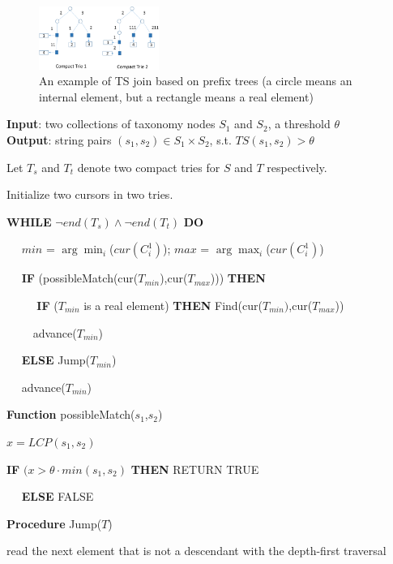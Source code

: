 \begin{figure}[t]
\centering
\includegraphics[width=0.35\textwidth]{figures/prefixTrees}
 \caption{An example of TS join based on prefix trees (a circle means an internal element, but a rectangle means a real element)}
\label{fig:taxonomyexample}
\end{figure}



\begin{algorithm}
{\bf Input}: two collections of taxonomy nodes $S_1$ and $S_2$,  a threshold $\theta$ \\
{\bf Output}: string pairs $(s_1,s_2) \in S_1 \times S_2$, s.t. $TS(s_1, s_2) > \theta$
\begin{compactenum}[(1)]
\item Let $T_s$ and $T_t$ denote two compact tries for $S$ and $T$ respectively. 
\item Initialize two cursors in two tries.
\item {\bf WHILE} $\neg end(T_s) \wedge  \neg end(T_t)$ {\bf DO}
\item  ~~ $min$ = $\arg\min_{i}$($cur(C_i^1)$); $max$ = $\arg\max_{i}$($cur(C_i^1)$)
\item  ~~ {\bf IF} (possibleMatch(cur($T_{min}$),cur($T_{max}$))) {\bf THEN}
\item ~~ ~~ {\bf  IF} ($T_{min}$ is a real element)   {\bf THEN} Find(cur($T_{min})$,cur($T_{max}$))
 \item ~~~~ advance($T_{min}$)
 \item ~~ {\bf ELSE} Jump($T_{min}$)
 \item ~~ advance($T_{min}$)
\end{compactenum}
\smallskip
\textbf{Function} possibleMatch($s_1$,$s_2$)
\begin{compactenum}[(1)]
\item  $x = LCP(s_1,s_2)$
\item {\bf IF}  $(x > \theta \cdot min (s_1, s_2 )$  {\bf THEN} RETURN TRUE
\item   ~~ {\bf ELSE} FALSE
\end{compactenum}
\smallskip
\textbf{Procedure} Jump($T$)
\begin{compactenum}[(1)]
\item  read the next element that is not a descendant with the depth-first traversal

\end{compactenum}
\end{algorithm}
